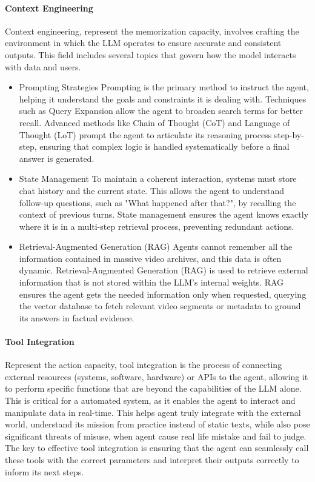 \paragraph*{Context Engineering}
Context engineering, represent the memorization capacity, involves crafting the environment in which the LLM operates to ensure accurate and consistent outputs. This field includes several topics that govern how the model interacts with data and users.
\begin{itemize} 

\item{Prompting Strategies}
Prompting is the primary method to instruct the agent, helping it understand the goals and constraints it is dealing with. Techniques such as Query Expansion allow the agent to broaden search terms for better recall. Advanced methods like Chain of Thought (CoT) and Language of Thought (LoT) prompt the agent to articulate its reasoning process step-by-step, ensuring that complex logic is handled systematically before a final answer is generated.

\item{State Management}
To maintain a coherent interaction, systems must store chat history and the current state. This allows the agent to understand follow-up questions, such as "What happened after that?", by recalling the context of previous turns. State management ensures the agent knows exactly where it is in a multi-step retrieval process, preventing redundant actions.

\item{Retrieval-Augmented Generation (RAG)}
Agents cannot remember all the information contained in massive video archives, and this data is often dynamic. Retrieval-Augmented Generation (RAG) is used to retrieve external information that is not stored within the LLM's internal weights. RAG ensures the agent gets the needed information only when requested, querying the vector database to fetch relevant video segments or metadata to ground its answers in factual evidence.
\end{itemize}
\paragraph*{Tool Integration}
Represent the action capacity, tool integration is the process of connecting external resources (systems, software, hardware) or APIs to the agent, allowing it to perform specific functions that 
are beyond the capabilities of the LLM alone. This is critical for a automated system, as it enables the agent to interact and manipulate data in real-time. This helps 
agent 
truly integrate with the external world, understand its mission from practice instead of static texts, while also pose significant threats of misuse, when agent cause 
real life mistake and fail to judge. The key to effective tool integration is ensuring that the agent can seamlessly call these tools with the correct parameters and interpret their outputs correctly to inform its next steps.

